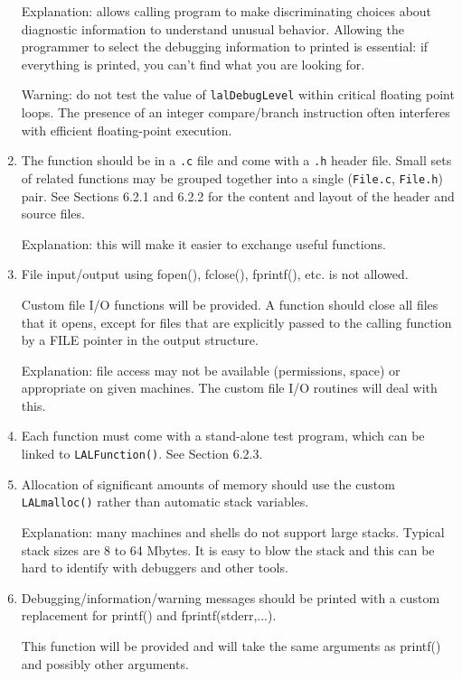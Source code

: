 \documentclass[]{ligodcc}
\begin{document}
\begin{enumerate}
Explanation: allows calling program to make discriminating choices
about diagnostic information to understand unusual behavior. Allowing
the programmer to  select the debugging information to printed is
essential: if everything is printed, you can't  find what you are
looking for. 

Warning: do not test the value of {\tt lalDebugLevel} within critical
floating point loops. The presence of an integer compare/branch
instruction often interferes with efficient floating-point execution.

\item
The function should be in a {\tt .c} file and come with a {\tt .h} header
file.  Small sets of related functions may be grouped together into a
single ({\tt File.c}, {\tt File.h}) pair.  See Sections  6.2.1 and 6.2.2 for the
content and layout of the header and source files.

Explanation: this will make it easier to exchange useful functions. 

\item
File input/output using fopen(), fclose(), fprintf(), etc. is
not allowed. 

Custom file I/O functions will be provided. A function should close
all files that it opens, except for files that are explicitly passed
to the calling function by a FILE pointer in the output structure.

Explanation: file access may not be available (permissions, space) or
appropriate on given machines. The custom file I/O routines will deal
with this.

\item
Each function must come with a stand-alone test program, which
can be linked to {\tt LALFunction()}.  See Section 6.2.3. 

\item
Allocation of significant amounts of memory should use the
custom {\tt LALmalloc()} rather than automatic stack variables.

Explanation: many machines and shells do not support large stacks.
Typical stack sizes are 8 to 64 Mbytes. It is easy to blow the stack
and this can be hard to identify with debuggers and other tools.

\item
Debugging/information/warning messages should be printed with
a custom replacement for printf() and fprintf(stderr,...).

This function will be provided and will take the same arguments as
printf() and possibly other arguments.


\end{enumerate}
\end{document}
